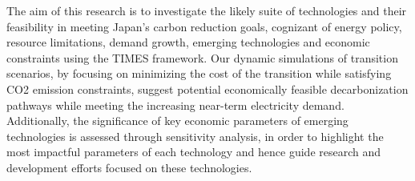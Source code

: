 The aim of this research is to investigate the likely suite of technologies and their feasibility in meeting Japan's carbon reduction goals, cognizant of energy policy, resource limitations, demand growth, emerging technologies and economic constraints using the TIMES framework. Our dynamic simulations of transition scenarios, by focusing on minimizing the cost of the transition while satisfying CO2 emission constraints, suggest potential economically feasible decarbonization pathways while meeting the increasing near-term electricity demand. Additionally, the significance of key economic parameters of emerging technologies is assessed through sensitivity analysis, in order to highlight the most impactful parameters of each technology and hence guide research and development efforts focused on these technologies.
